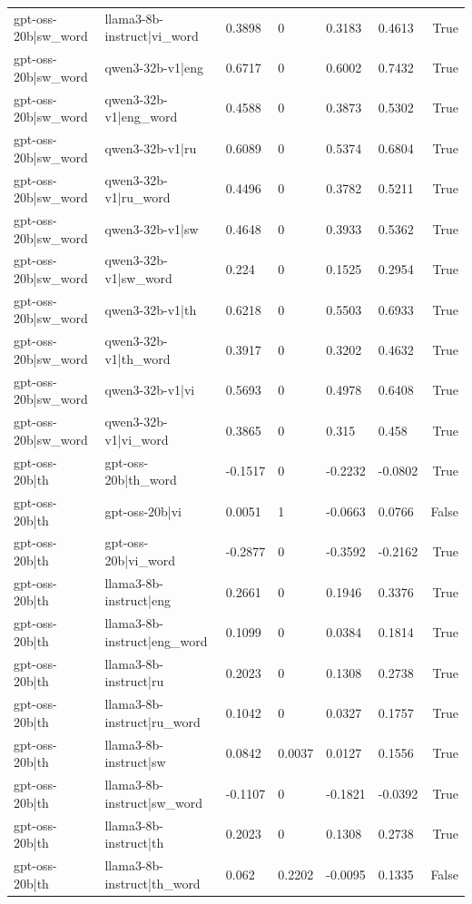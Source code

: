 \begin{table}
\begin{tabular}{llllllr}
gpt-oss-20b|sw_word & llama3-8b-instruct|vi_word & 0.3898 & 0 & 0.3183 & 0.4613 & True \\
gpt-oss-20b|sw_word & qwen3-32b-v1|eng & 0.6717 & 0 & 0.6002 & 0.7432 & True \\
gpt-oss-20b|sw_word & qwen3-32b-v1|eng_word & 0.4588 & 0 & 0.3873 & 0.5302 & True \\
gpt-oss-20b|sw_word & qwen3-32b-v1|ru & 0.6089 & 0 & 0.5374 & 0.6804 & True \\
gpt-oss-20b|sw_word & qwen3-32b-v1|ru_word & 0.4496 & 0 & 0.3782 & 0.5211 & True \\
gpt-oss-20b|sw_word & qwen3-32b-v1|sw & 0.4648 & 0 & 0.3933 & 0.5362 & True \\
gpt-oss-20b|sw_word & qwen3-32b-v1|sw_word & 0.224 & 0 & 0.1525 & 0.2954 & True \\
gpt-oss-20b|sw_word & qwen3-32b-v1|th & 0.6218 & 0 & 0.5503 & 0.6933 & True \\
gpt-oss-20b|sw_word & qwen3-32b-v1|th_word & 0.3917 & 0 & 0.3202 & 0.4632 & True \\
gpt-oss-20b|sw_word & qwen3-32b-v1|vi & 0.5693 & 0 & 0.4978 & 0.6408 & True \\
gpt-oss-20b|sw_word & qwen3-32b-v1|vi_word & 0.3865 & 0 & 0.315 & 0.458 & True \\
gpt-oss-20b|th & gpt-oss-20b|th_word & -0.1517 & 0 & -0.2232 & -0.0802 & True \\
gpt-oss-20b|th & gpt-oss-20b|vi & 0.0051 & 1 & -0.0663 & 0.0766 & False \\
gpt-oss-20b|th & gpt-oss-20b|vi_word & -0.2877 & 0 & -0.3592 & -0.2162 & True \\
gpt-oss-20b|th & llama3-8b-instruct|eng & 0.2661 & 0 & 0.1946 & 0.3376 & True \\
gpt-oss-20b|th & llama3-8b-instruct|eng_word & 0.1099 & 0 & 0.0384 & 0.1814 & True \\
gpt-oss-20b|th & llama3-8b-instruct|ru & 0.2023 & 0 & 0.1308 & 0.2738 & True \\
gpt-oss-20b|th & llama3-8b-instruct|ru_word & 0.1042 & 0 & 0.0327 & 0.1757 & True \\
gpt-oss-20b|th & llama3-8b-instruct|sw & 0.0842 & 0.0037 & 0.0127 & 0.1556 & True \\
gpt-oss-20b|th & llama3-8b-instruct|sw_word & -0.1107 & 0 & -0.1821 & -0.0392 & True \\
gpt-oss-20b|th & llama3-8b-instruct|th & 0.2023 & 0 & 0.1308 & 0.2738 & True \\
gpt-oss-20b|th & llama3-8b-instruct|th_word & 0.062 & 0.2202 & -0.0095 & 0.1335 & False \\

\end{tabular}
\end{table}
